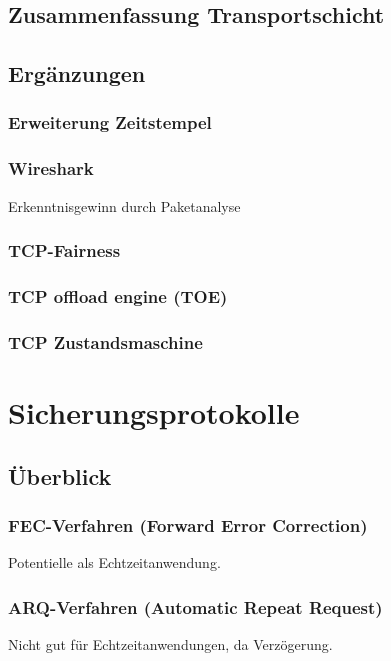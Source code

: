 \section{Zusammenfassung Transportschicht}

\section{Ergänzungen}
\subsection{Erweiterung Zeitstempel}
\subsection{Wireshark}
Erkenntnisgewinn durch Paketanalyse
\subsection{TCP-Fairness}
\subsection{TCP offload engine (TOE)}
\subsection{TCP Zustandsmaschine}

\chapter{Sicherungsprotokolle}
\section{Überblick}
\subsection{FEC-Verfahren (Forward Error Correction)}
Potentielle als Echtzeitanwendung.

\subsection{ARQ-Verfahren (Automatic Repeat Request)}
Nicht gut für Echtzeitanwendungen, da Verzögerung.

